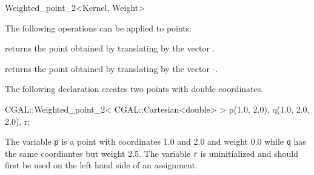 \begin{ccRefClass} {Weighted_point_2<Kernel, Weight>}

The following operations can be applied to points:

       {returns the point obtained by translating  by the 
        vector .}

       {returns the point obtained by translating  by the 
        vector -.}

\ccExample

The following declaration creates two points with
 double coordinates.

\begin{cprog}

  CGAL::Weighted_point_2< CGAL::Cartesian<double> > p(1.0, 2.0), q(1.0, 2.0, 2.0), r;
\end{cprog} 

The variable \texttt{p} is a point with 
coordinates 1.0 and 2.0 and weight 0.0 while \texttt{q} has the same 
coordiantes but weight 2.5.
The variable {\tt r} is uninitialized and should first be used on 
the left hand side of an assignment. 

\ccSeeAlso
{} \\

\end{ccRefClass} 
